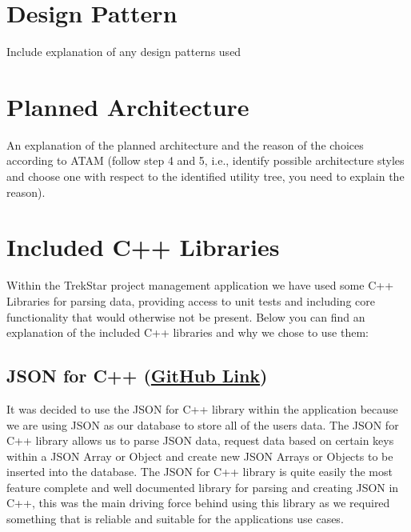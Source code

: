 \documentclass[
  english,
  a4paper,
,tablecaptionabove
]{scrartcl}
\begin{document}
\newpage

\hypertarget{design-pattern}{%
\section{Design Pattern}\label{design-pattern}}

Include explanation of any design patterns used

\newpage

\hypertarget{planned-architecture}{%
\section{Planned Architecture}\label{planned-architecture}}

An explanation of the planned architecture and the reason of the choices
according to ATAM (follow step 4 and 5, i.e., identify possible
architecture styles and choose one with respect to the identified
utility tree, you need to explain the reason).

\newpage

\hypertarget{included-c-libraries}{%
\section{Included C++ Libraries}\label{included-c-libraries}}

Within the TrekStar project management application we have used some C++
Libraries for parsing data, providing access to unit tests and including
core functionality that would otherwise not be present. Below you can
find an explanation of the included C++ libraries and why we chose to
use them:

\hypertarget{json-for-c-github-link}{%
\subsection{\texorpdfstring{JSON for C++
(\href{https://github.com/nlohmann/json}{GitHub
Link})}{JSON for C++ (GitHub Link)}}\label{json-for-c-github-link}}

It was decided to use the JSON for C++ library within the application
because we are using JSON as our database to store all of the users
data. The JSON for C++ library allows us to parse JSON data, request
data based on certain keys within a JSON Array or Object and create new
JSON Arrays or Objects to be inserted into the database. The JSON for
C++ library is quite easily the most feature complete and well
documented library for parsing and creating JSON in C++, this was the
main driving force behind using this library as we required something
that is reliable and suitable for the applications use cases.
\end{document}
